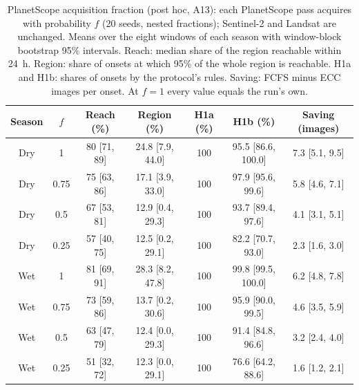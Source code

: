 \begin{table}[H]
\centering
\footnotesize
\renewcommand{\arraystretch}{1.2}
\setlength{\tabcolsep}{3pt}
\caption{PlanetScope acquisition fraction (post hoc, A13): each PlanetScope pass acquires with probability $f$ (20 seeds, nested fractions); Sentinel-2 and Landsat are unchanged. Means over the eight windows of each season with window-block bootstrap 95\% intervals. Reach: median share of the region reachable within 24~h. Region: share of onsets at which 95\% of the whole region is reachable. H1a and H1b: shares of onsets by the protocol's rules. Saving: FCFS minus ECC images per onset. At $f = 1$ every value equals the run's own.}
\label{tab:a13}
\begin{tabular}{|c|c|c|c|c|c|c|}
\hline
Season & $f$ & Reach (\%) & Region (\%) & H1a (\%) & H1b (\%) & Saving (images) \\
\hline
Dry & 1 & 80 [71, 89] & 24.8 [7.9, 44.0] & 100 & 95.5 [86.6, 100.0] & 7.3 [5.1, 9.5] \\
\hline
Dry & 0.75 & 75 [63, 86] & 17.1 [3.9, 33.0] & 100 & 97.9 [95.6, 99.6] & 5.8 [4.6, 7.1] \\
\hline
Dry & 0.5 & 67 [53, 81] & 12.9 [0.4, 29.3] & 100 & 93.7 [89.4, 97.6] & 4.1 [3.1, 5.1] \\
\hline
Dry & 0.25 & 57 [40, 75] & 12.5 [0.2, 29.1] & 100 & 82.2 [70.7, 93.0] & 2.3 [1.6, 3.0] \\
\hline
Wet & 1 & 81 [69, 91] & 28.3 [8.2, 47.8] & 100 & 99.8 [99.5, 100.0] & 6.2 [4.8, 7.8] \\
\hline
Wet & 0.75 & 73 [59, 86] & 13.7 [0.2, 30.6] & 100 & 95.9 [90.0, 99.5] & 4.6 [3.5, 5.9] \\
\hline
Wet & 0.5 & 63 [47, 79] & 12.4 [0.0, 29.3] & 100 & 91.4 [84.8, 96.6] & 3.2 [2.4, 4.0] \\
\hline
Wet & 0.25 & 51 [32, 72] & 12.3 [0.0, 29.1] & 100 & 76.6 [64.2, 88.6] & 1.6 [1.2, 2.1] \\
\hline
\end{tabular}
\end{table}
